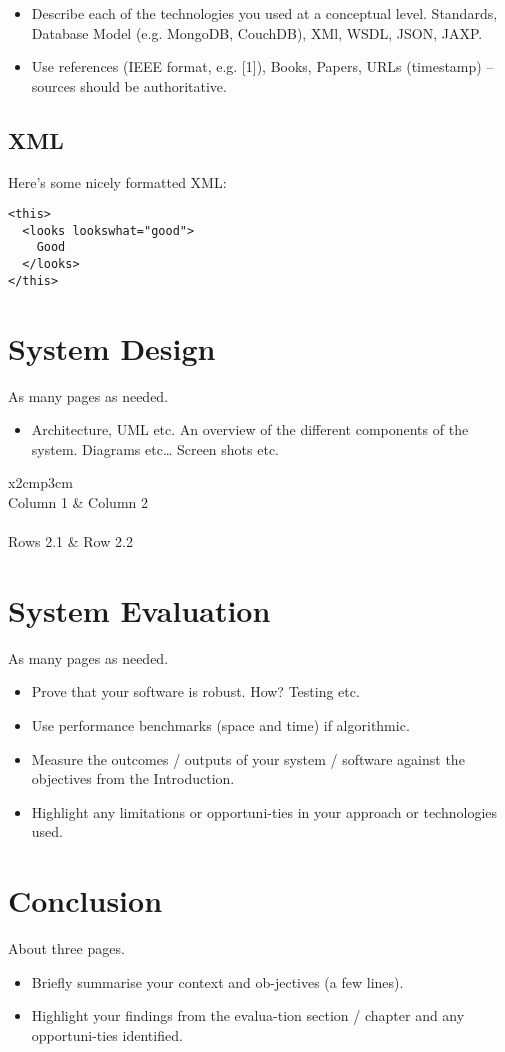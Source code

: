 \begin{itemize}
\item Describe each of the technologies you used at a conceptual level. Standards, Database Model (e.g. MongoDB, CouchDB), XMl, WSDL, JSON, JAXP.
\item Use references (IEEE format, e.g. [1]), Books, Papers, URLs (timestamp) – sources should be authoritative. 
\end{itemize}

\section{XML}
Here's some nicely formatted XML:
\begin{verbatim}
<this>
  <looks lookswhat="good">
    Good
  </looks>
</this>
\end{verbatim}

\chapter{System Design}
As many pages as needed.
\begin{itemize}
\item Architecture, UML etc. An overview of the different components of the system. Diagrams etc… Screen shots etc.
\end{itemize}

\begin{table}[h]
  \centering
  \begin{tabular}{x{2cm}p{3cm}}
    \toprule \\
    Column 1 & Column 2 \\
    \midrule \\
    Rows 2.1 & Row 2.2 \\
    \bottomrule
  \end{tabular}
  \caption{A table.}
  \label{table:mytable}
\end{table}

\chapter{System Evaluation}
As many pages as needed.
\begin{itemize}
\item Prove that your software is robust. How? Testing etc. 
\item Use performance benchmarks (space and time) if algorithmic.
\item Measure the outcomes / outputs of your system / software against the objectives from the Introduction.
\item Highlight any limitations or opportuni-ties in your approach or technologies used.
\end{itemize}

\chapter{Conclusion}
About three pages.

\begin{itemize}
\item Briefly summarise your context and ob-jectives (a few lines).
\item Highlight your findings from the evalua-tion section / chapter and any opportuni-ties identified.
\end{itemize}

